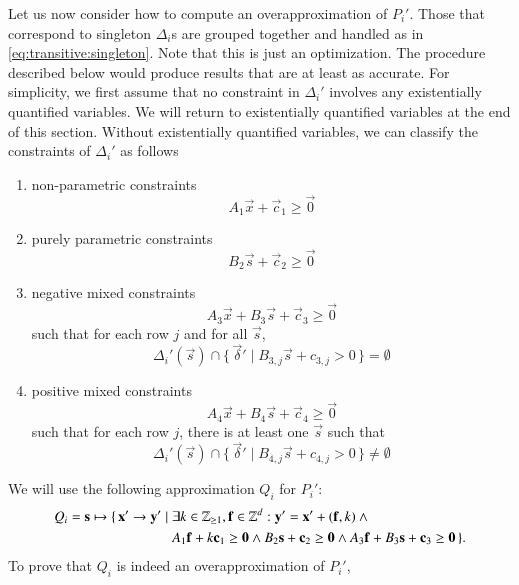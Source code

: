 Let us now consider how to compute an overapproximation of $P_i'$.
Those that correspond to singleton $\Delta_i$s are grouped together
and handled as in \eqref{eq:transitive:singleton}.
Note that this is just an optimization.  The procedure described
below would produce results that are at least as accurate.
For simplicity, we first assume that no constraint in $\Delta_i'$
involves any existentially quantified variables.
We will return to existentially quantified variables at the end
of this section.
Without existentially quantified variables, we can classify
the constraints of $\Delta_i'$ as follows
\begin{enumerate}
\item non-parametric constraints
\begin{equation}
\label{eq:transitive:non-parametric}
A_1 \vec x + \vec c_1 \geq \vec 0
\end{equation}
\item purely parametric constraints
\begin{equation}
\label{eq:transitive:parametric}
B_2 \vec s + \vec c_2 \geq \vec 0
\end{equation}
\item negative mixed constraints
\begin{equation}
\label{eq:transitive:mixed}
A_3 \vec x + B_3 \vec s + \vec c_3 \geq \vec 0
\end{equation}
such that for each row $j$ and for all $\vec s$,
$$
\Delta_i'(\vec s) \cap
\{\, \vec \delta' \mid B_{3,j} \vec s + c_{3,j} > 0 \,\}
= \emptyset
$$
\item positive mixed constraints
$$
A_4 \vec x + B_4 \vec s + \vec c_4 \geq \vec 0
$$
such that for each row $j$, there is at least one $\vec s$ such that
$$
\Delta_i'(\vec s) \cap
\{\, \vec \delta' \mid B_{4,j} \vec s + c_{4,j} > 0 \,\}
\ne \emptyset
$$
\end{enumerate}
We will use the following approximation $Q_i$ for $P_i'$:
\begin{equation}
\label{eq:transitive:Q}
\begin{aligned}
Q_i = \vec s \mapsto
\{\,
\vec x' \to \vec y'
\mid {} & \exists k \in \Z_{\ge 1}, \vec f \in \Z^d :
\vec y' = \vec x' + (\vec f, k)
\wedge {}
\\
&
A_1 \vec f + k \vec c_1 \geq \vec 0
\wedge
B_2 \vec s + \vec c_2 \geq \vec 0
\wedge
A_3 \vec f + B_3 \vec s + \vec c_3 \geq \vec 0
\,\}
.
\end{aligned}
\end{equation}
To prove that $Q_i$ is indeed an overapproximation of $P_i'$,

